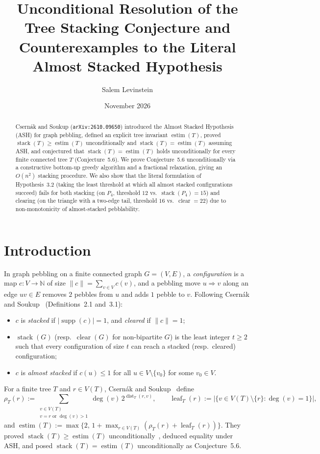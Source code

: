 \documentclass[11pt]{article}
\title{Unconditional Resolution of the Tree Stacking Conjecture and Counterexamples to the Literal Almost Stacked Hypothesis}
\author{Salem Levinstein}
\date{November 2026}
\DeclareMathOperator{\stack}{stack}
\DeclareMathOperator{\clear}{clear}
\DeclareMathOperator{\estim}{estim}
\DeclareMathOperator{\supp}{supp}
\DeclareMathOperator{\dist}{dist}
\DeclareMathOperator{\leaf}{leaf}
\begin{document}
\maketitle

\begin{abstract}
Csern\'ak and Soukup (\texttt{arXiv:2610.09650}) introduced the Almost Stacked Hypothesis (ASH) for graph pebbling, defined an explicit tree invariant $\estim(T)$, proved $\stack(T) \ge \estim(T)$ unconditionally and $\stack(T) = \estim(T)$ assuming ASH, and conjectured that $\stack(T) = \estim(T)$ holds unconditionally for every finite connected tree $T$ (Conjecture~5.6). We prove Conjecture~5.6 unconditionally via a constructive bottom-up greedy algorithm and a fractional relaxation, giving an $O(n^2)$ stacking procedure. We also show that the literal formulation of Hypothesis~3.2 (taking the least threshold at which all almost stacked configurations succeed) fails for both stacking (on $P_4$, threshold $12$ vs.\ $\stack(P_4)=15$) and clearing (on the triangle with a two-edge tail, threshold $16$ vs.\ $\clear=22$) due to non-monotonicity of almost-stacked pebblability.
\end{abstract}

\section{Introduction}

In graph pebbling on a finite connected graph $G = (V, E)$, a \emph{configuration} is a map $c : V \to \mathbb{N}$ of size $\|c\| = \sum_{v \in V} c(v)$, and a pebbling move $u \Rightarrow v$ along an edge $uv \in E$ removes $2$ pebbles from $u$ and adds $1$ pebble to $v$. Following Csern\'ak and Soukup~\cite{CS26} (Definitions~2.1 and~3.1):
\begin{itemize}
  \item $c$ is \emph{stacked} if $|\supp(c)| = 1$, and \emph{cleared} if $\|c\| = 1$;
  \item $\stack(G)$ (resp.\ $\clear(G)$ for non-bipartite $G$) is the least integer $t \ge 2$ such that every configuration of size $t$ can reach a stacked (resp.\ cleared) configuration;
  \item $c$ is \emph{almost stacked} if $c(u) \le 1$ for all $u \in V \setminus \{v_0\}$ for some $v_0 \in V$.
\end{itemize}

For a finite tree $T$ and $r \in V(T)$, Csern\'ak and Soukup~\cite[Definition~5.1]{CS26} define
\[
\rho_T(r) := \sum_{\substack{v \in V(T) \\ v = r \text{ or } \deg(v) > 1}} \deg(v) \, 2^{\dist_T(r,v)}, \qquad
\leaf_T(r) := |\{v \in V(T) \setminus \{r\} : \deg(v) = 1\}|,
\]
and $\estim(T) := \max\bigl\{2,\, 1 + \max_{r \in V(T)}(\rho_T(r) + \leaf_T(r))\bigr\}$. They proved $\stack(T) \ge \estim(T)$ unconditionally~\cite[Theorem~5.2]{CS26}, deduced equality under ASH, and posed $\stack(T) = \estim(T)$ unconditionally as Conjecture~5.6.
\end{document}
